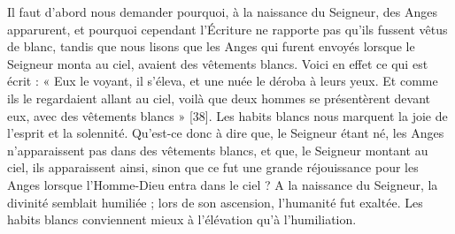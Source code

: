 Il faut d’abord nous demander pourquoi, à la naissance du Seigneur, des Anges apparurent, et pourquoi cependant l’Écriture ne rapporte pas qu’ils fussent vêtus de blanc, tandis que nous lisons que les Anges qui furent envoyés lorsque le Seigneur monta au ciel, avaient des vêtements blancs. Voici en effet ce qui est écrit : « Eux le voyant, il s’éleva, et une nuée le déroba à leurs yeux. Et comme ils le regardaient allant au ciel, voilà que deux hommes se présentèrent devant eux, avec des vêtements blancs » [38]. Les habits blancs nous marquent la joie de l’esprit et la solennité. Qu’est-ce donc à dire que, le Seigneur étant né, les Anges n’apparaissent pas dans des vêtements blancs, et que, le Seigneur montant au ciel, ils apparaissent ainsi, sinon que ce fut une grande réjouissance pour les Anges lorsque l’Homme-Dieu entra dans le ciel ? A la naissance du Seigneur, la divinité semblait humiliée ; lors de son ascension, l’humanité fut exaltée. Les habits blancs conviennent mieux à l’élévation qu’à l’humiliation.
